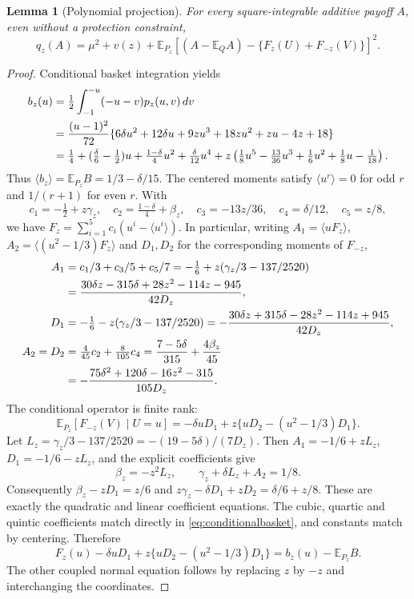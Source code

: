\documentclass[11pt,a4paper]{amsart}
\theoremstyle{plain}
\newtheorem{lemma}[theorem]{Lemma}
\theoremstyle{definition}
\theoremstyle{remark}
\newcommand{\EE}{\mathbb{E}}
\newcommand{\br}[1]{\langle #1\rangle}
\begin{document}
\begin{lemma}[Polynomial projection]\label{lem:projection}
For every square-integrable additive payoff $A$, even without a protection constraint,
\begin{equation}\label{eq:pythagorean}
 q_z(A)=\mu^2+v(z)+\EE_{P_z}\left[
 (A-\EE_QA)-\{F_z(U)+F_{-z}(V)\}\right]^2.
\end{equation}
\end{lemma}
\begin{proof}
Conditional basket integration yields
\begin{align}\label{eq:conditionalbasket}
 b_z(u)&=\tfrac12\int_{-1}^{-u}(-u-v)p_z(u,v)\,dv\notag\\
 &=\frac{(u-1)^2}{72}\{6\delta u^2+12\delta u
                  +9zu^3+18zu^2+zu-4z+18\}\notag\\
 &=\tfrac14+(\tfrac\delta6-\tfrac12)u
   +\tfrac{1-\delta}{4}u^2+\tfrac\delta{12}u^4
   +z\left(\tfrac18u^5-\tfrac{13}{36}u^3+\tfrac16u^2+\tfrac18u-\tfrac1{18}\right).
\end{align}
Thus $\br{b_z}=\EE_{P_z}B=1/3-\delta/15$. The centered moments satisfy
$\br{u^r}=0$ for odd $r$ and $1/(r+1)$ for even $r$. With
\[
 c_1=-\tfrac12+z\gamma_z,\quad c_2=\tfrac{1-\delta}{4}+\beta_z,
 \quad c_3=-13z/36,\quad c_4=\delta/12,\quad c_5=z/8,
\]
we have $F_z=\sum_{i=1}^5c_i(u^i-\br{u^i})$. In particular, writing
$A_1=\br{uF_z}$, $A_2=\br{(u^2-1/3)F_z}$ and $D_1,D_2$ for the corresponding moments of $F_{-z}$,
\begin{align}\label{eq:projectionmoments}
 A_1&=c_1/3+c_3/5+c_5/7
 =-\tfrac16+z(\gamma_z/3-137/2520)\notag\\
 &=\frac{30\delta z-315\delta+28z^2-114z-945}{42D_z},\notag\\
 D_1&=-\tfrac16-z(\gamma_z/3-137/2520)
 =-\frac{30\delta z+315\delta-28z^2-114z+945}{42D_z},\notag\\
 A_2=D_2&=\tfrac4{45}c_2+\tfrac8{105}c_4
 =\frac{7-5\delta}{315}+\frac{4\beta_z}{45}\notag\\
 &=-\frac{75\delta^2+120\delta-16z^2-315}{105D_z}.
\end{align}
The conditional operator is finite rank:
\[
 \EE_{P_z}[F_{-z}(V)\mid U=u]
 =-\delta uD_1+z\{uD_2-(u^2-1/3)D_1\}.
\]
Let $L_z=\gamma_z/3-137/2520=-(19-5\delta)/(7D_z)$. Then
$A_1=-1/6+zL_z$, $D_1=-1/6-zL_z$, and the explicit coefficients give
\[
 \beta_z=-z^2L_z,\qquad
 \gamma_z+\delta L_z+A_2=1/8.
\]
Consequently $\beta_z-zD_1=z/6$ and
$z\gamma_z-\delta D_1+zD_2=\delta/6+z/8$. These are exactly the quadratic and linear coefficient equations. The cubic, quartic and quintic coefficients match directly in \eqref{eq:conditionalbasket}, and constants match by centering. Therefore
\begin{equation}\label{eq:normalequation}
 F_z(u)-\delta uD_1+z\{uD_2-(u^2-1/3)D_1\}
 =b_z(u)-\EE_{P_z}B.
\end{equation}
The other coupled normal equation follows by replacing $z$ by $-z$ and interchanging the coordinates.


\end{proof}
\end{document}
